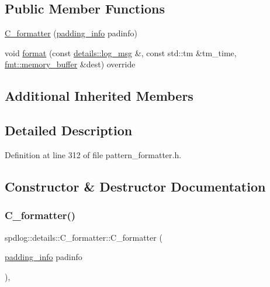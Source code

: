 \subsection*{Public Member Functions}
\begin{DoxyCompactItemize}
\item 
\hyperlink{classspdlog_1_1details_1_1_c__formatter_a8b9038a7449cb208fd2a6b1a886b7be8}{C\+\_\+formatter} (\hyperlink{structspdlog_1_1details_1_1padding__info}{padding\+\_\+info} padinfo)
\item 
void \hyperlink{classspdlog_1_1details_1_1_c__formatter_a241d6298edc054937cf40c0d7ed90ae2}{format} (const \hyperlink{structspdlog_1_1details_1_1log__msg}{details\+::log\+\_\+msg} \&, const std\+::tm \&tm\+\_\+time, \hyperlink{format_8h_a21cbf729f69302f578e6db21c5e9e0d2}{fmt\+::memory\+\_\+buffer} \&dest) override
\end{DoxyCompactItemize}
\subsection*{Additional Inherited Members}


\subsection{Detailed Description}


Definition at line 312 of file pattern\+\_\+formatter.\+h.



\subsection{Constructor \& Destructor Documentation}
\mbox{\label{classspdlog_1_1details_1_1_c__formatter_a8b9038a7449cb208fd2a6b1a886b7be8}} 
\subsubsection{\texorpdfstring{C\+\_\+formatter()}{C\_formatter()}}
{\footnotesize\ttfamily spdlog\+::details\+::\+C\+\_\+formatter\+::\+C\+\_\+formatter (\begin{DoxyParamCaption}\item[{\hyperlink{structspdlog_1_1details_1_1padding__info}{padding\+\_\+info}}]{padinfo }\end{DoxyParamCaption})\hspace{0.3cm}{\ttfamily [inline]}, {\ttfamily [explicit]}}




